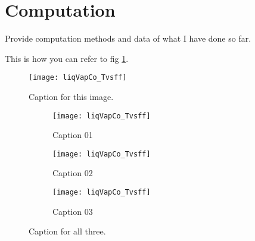 \section{Computation}

Provide computation methods and data of what I have done so far.

This is how you can refer to fig \ref{fig:liq vap co}. %


\begin{figure}[h]
	\centering
	\texttt{[image: liqVapCo\_Tvsff]}
	\caption{Caption for this image.}
	\label{fig:liq vap co}
\end{figure}

\begin{figure}[h]
	\centering
	\begin{subfigure}[b]{0.3\textwidth}
	\texttt{[image: liqVapCo\_Tvsff]}
	\caption{Caption 01}
	\label{fig:cap01}
	\end{subfigure}
	\hfill
	\begin{subfigure}[b]{0.3\textwidth}
	\texttt{[image: liqVapCo\_Tvsff]}
	\caption{Caption 02}
	\label{fig:cap01}
	\end{subfigure}
	\hfill
	\begin{subfigure}[b]{0.3\textwidth}
	\texttt{[image: liqVapCo\_Tvsff]}
	\caption{Caption 03}
	\label{fig:cap01}
	\end{subfigure}
	\caption{Caption for all three.}
	\label{fig:cap123}
\end{figure}